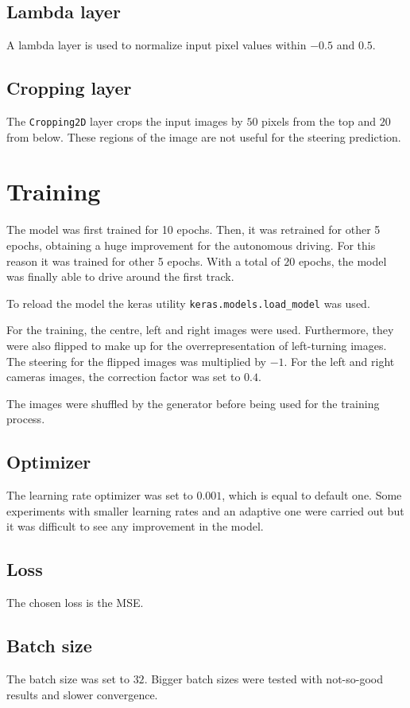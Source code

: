 \documentclass{article}
\let\cd\lstinline
\begin{document}
\subsection{Lambda layer}
A lambda layer is used to normalize input pixel values within $-0.5$ and $0.5$. 

\subsection{Cropping layer}
The \cd+Cropping2D+ layer crops the input images by $50$ pixels from the top and $20$ from below. These regions of the image are not useful for the steering prediction.

\section{Training}
The model was first trained for 10 epochs. Then, it was retrained for other 5 epochs, obtaining a huge improvement for the autonomous driving. For this reason it was trained for other 5 epochs. With a total of $20$ epochs, the model was finally able to drive around the first track.

To reload the model the keras utility \cd+keras.models.load_model+ was used.

For the training, the centre, left and right images were used. Furthermore, they were also flipped to make up for the overrepresentation of left-turning images. The steering for the flipped images was multiplied by $-1$. For the left and right cameras images, the correction factor was set to $0.4$.

The images were shuffled by the generator before being used for the training process.

\subsection{Optimizer}
The learning rate optimizer was set to $0.001$, which is equal to default one. Some experiments with smaller learning rates and an adaptive one were carried out but it was difficult to see any improvement in the model.

\subsection{Loss}
The chosen loss is the MSE.

\subsection{Batch size}
The batch size was set to $32$. Bigger batch sizes were tested with not-so-good results and slower convergence.
\end{document}
